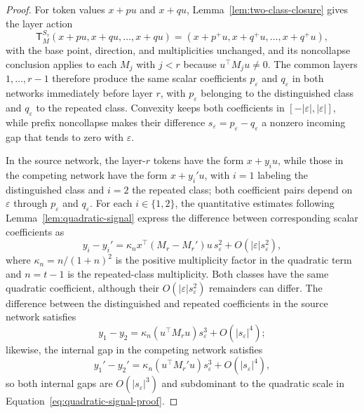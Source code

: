 \documentclass[mlmain]{jmlr}
\newcommand{\T}{\mathsf{T}}
\begin{document}
\begin{proof}
For token values $x+pu$ and $x+qu$,
Lemma~\ref{lem:two-class-closure} gives the layer action
\begin{equation}
 \T_M^{S_\tau}(x+pu,x+qu,\ldots,x+qu)
 =(x+p^+u,x+q^+u,\ldots,x+q^+u),
 \label{eq:two-class-form-proof}
\end{equation}
with the base point, direction, and multiplicities unchanged, and its
noncollapse conclusion applies to each $M_j$ with $j<r$ because
$u^\top M_j u\ne0$.  The common layers $1,\ldots,r-1$ therefore produce the same
scalar coefficients $p_\varepsilon$ and $q_\varepsilon$ in both networks
immediately before layer $r$, with $p_\varepsilon$ belonging to the
distinguished class and $q_\varepsilon$ to the repeated class.  Convexity
keeps both coefficients in $[-|\varepsilon|,|\varepsilon|]$, while prefix
noncollapse makes their difference $s_\varepsilon=p_\varepsilon-q_\varepsilon$
a nonzero incoming gap that tends to zero with $\varepsilon$.

In the source network, the layer-$r$ tokens have the form
$x+y_i u$, while those in the competing network have the form
$x+y_i' u$, with $i=1$ labeling the distinguished class and
$i=2$ the repeated class; both coefficient pairs depend on $\varepsilon$
through $p_\varepsilon$ and $q_\varepsilon$.  For each $i\in\{1,2\}$, the
quantitative estimates following Lemma~\ref{lem:quadratic-signal} express
the difference between corresponding scalar coefficients as
\begin{equation}
 y_i-y_i'
 =\kappa_n x^\top(M_r-M_r')u\,s_\varepsilon^2
  +O(|\varepsilon|s_\varepsilon^2),
 \label{eq:quadratic-signal-proof}
\end{equation}
where $\kappa_n=n/(1+n)^2$ is the positive multiplicity factor in the
quadratic term and $n=t-1$ is the repeated-class multiplicity.
Both classes have the same quadratic coefficient, although their
$O(|\varepsilon|s_\varepsilon^2)$ remainders can differ.  The difference
between the distinguished and repeated coefficients in the source network
satisfies
\begin{equation}
 y_1-y_2
 =\kappa_n(u^\top M_r u)s_\varepsilon^3+O(|s_\varepsilon|^4);
 \label{eq:cubic-gap-proof}
\end{equation}
likewise, the internal gap in the competing network satisfies
\begin{equation}
 y_1'-y_2'
 =\kappa_n(u^\top M_r' u)s_\varepsilon^3+O(|s_\varepsilon|^4),
 \label{eq:cubic-gap-primed-proof}
\end{equation}
so both internal gaps are $O(|s_\varepsilon|^3)$ and subdominant to the
quadratic scale in Equation~\eqref{eq:quadratic-signal-proof}.


\end{proof}
\end{document}
